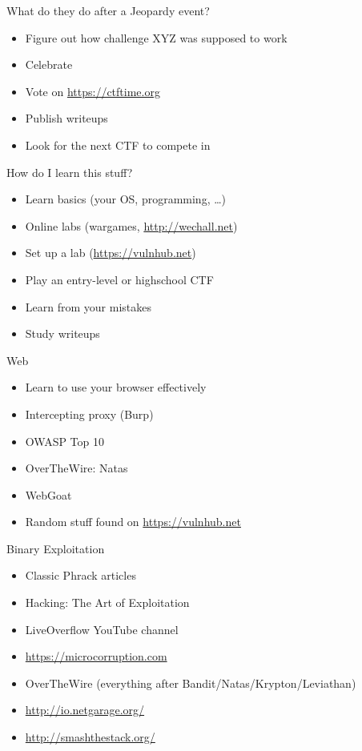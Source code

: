 \documentclass[presentation]{beamer}
\begin{document}
\begin{frame}[label={sec:org00f86f4}]{What do they do after a Jeopardy event?}
\begin{itemize}
\item Figure out how challenge XYZ was supposed to work
\item Celebrate
\item Vote on \url{https://ctftime.org}
\item Publish writeups
\item Look for the next CTF to compete in
\end{itemize}
\end{frame}

\begin{frame}[label={sec:org6cb1e69}]{How do I learn this stuff?}
\begin{itemize}
\item Learn basics (your OS, programming, \ldots{})
\item Online labs (wargames, \url{http://wechall.net})
\item Set up a lab (\url{https://vulnhub.net})
\item Play an entry-level or highschool CTF
\item Learn from your mistakes
\item Study writeups
\end{itemize}
\end{frame}

\begin{frame}[label={sec:org2de0739}]{Web}
\begin{itemize}
\item Learn to use your browser effectively
\item Intercepting proxy (Burp)
\item OWASP Top 10
\item OverTheWire: Natas
\item WebGoat
\item Random stuff found on \url{https://vulnhub.net}
\end{itemize}
\end{frame}

\begin{frame}[label={sec:org1ed4e6e}]{Binary Exploitation}
\begin{itemize}
\item Classic Phrack articles
\item{} Hacking: The Art of Exploitation
\item LiveOverflow YouTube channel
\item \url{https://microcorruption.com}
\item OverTheWire (everything after Bandit/Natas/Krypton/Leviathan)
\item \url{http://io.netgarage.org/}
\item \url{http://smashthestack.org/}
\end{itemize}
\end{frame}
\end{document}
